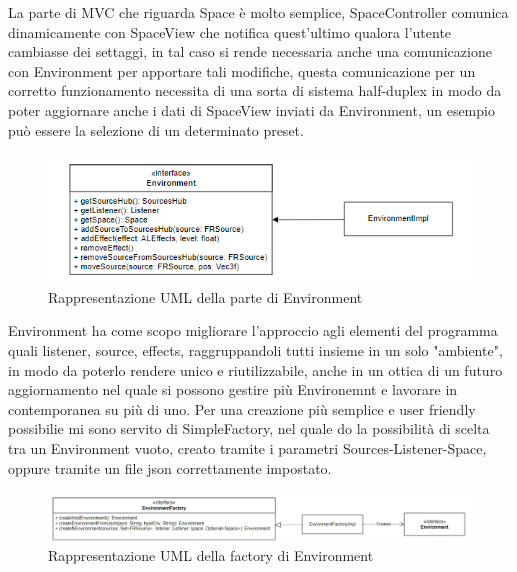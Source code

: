 \documentclass[a4paper,12pt]{report}
\begin{document}
La parte di MVC che riguarda Space è molto semplice, SpaceController comunica dinamicamente con SpaceView che notifica quest'ultimo qualora l'utente cambiasse dei settaggi, in tal caso si rende necessaria anche una comunicazione con Environment per apportare tali modifiche, questa comunicazione per un corretto funzionamento necessita di una sorta di sistema half-duplex in modo da poter aggiornare anche i dati di SpaceView inviati da Environment, un esempio può essere la selezione di un determinato preset.
%
\begin{figure}[H]
\centering{}
\includegraphics[width=\textwidth]{img/environment/Environment.png}
\caption{Rappresentazione UML della parte di Environment}
\label{img:environment}
\end{figure}
Environment ha come scopo migliorare l'approccio agli elementi del programma quali listener, source, effects, raggruppandoli tutti insieme in un solo "ambiente", in modo da poterlo rendere unico e riutilizzabile, anche in un ottica di un futuro aggiornamento nel quale si possono gestire più Environemnt e lavorare in contemporanea su più di uno.
Per una creazione più semplice e user friendly possibilie mi sono servito di SimpleFactory, nel quale do la possibilità di scelta tra un Environment vuoto, creato tramite i parametri Sources-Listener-Space, oppure tramite un file json correttamente impostato.
%
\begin{figure}[H]
\centering{}
\includegraphics[width=\textwidth]{img/environment/EnvironmentFactory.png}
\caption{Rappresentazione UML della factory di Environment}
\label{img:environmentfactory}
\end{figure}
\end{document}
